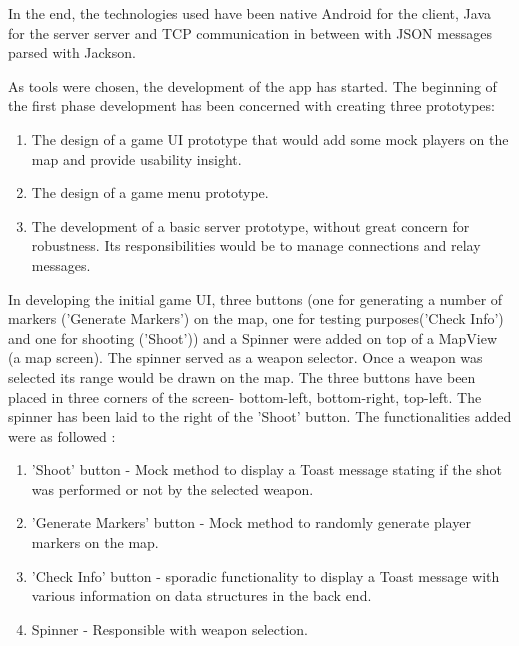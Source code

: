 In the end, the technologies used have been native Android for the
client, Java for the server server and TCP communication in between with JSON
messages parsed with Jackson. \newline

As tools were chosen, the development of the app has started.
The beginning of the first phase development has been concerned with creating
three prototypes:

\begin{enumerate}
  \item The design of a game UI prototype that would add some mock players on
  the map and provide usability insight.
  
  \item The design of a game menu prototype.
  
  \item The development of a basic server prototype, without great concern for
  robustness. Its responsibilities would be to manage connections and relay
  messages.
  
\end{enumerate}

In developing the initial game UI, three buttons (one for
generating a number of markers ('Generate Markers') on the map, one for testing
purposes('Check Info') and one for shooting ('Shoot')) and a Spinner were added
on top of a MapView (a map screen). The spinner served as a weapon selector.
Once a weapon was selected its range would be drawn on the map. The three
buttons have been placed in three corners of the screen- bottom-left,
bottom-right, top-left. The spinner has been laid to the right of the 'Shoot'
button. The functionalities added were as followed :

\begin{enumerate}
  \item 'Shoot' button - Mock method to display a Toast message stating if the
  shot was performed or not by the selected weapon.
  
  \item 'Generate Markers' button - Mock method to randomly generate
  player markers on the map.
  
  \item 'Check Info' button - sporadic functionality to display a Toast message
  with various information on data structures in the back end.
  
  \item Spinner - Responsible with weapon selection. 
\end{enumerate}


